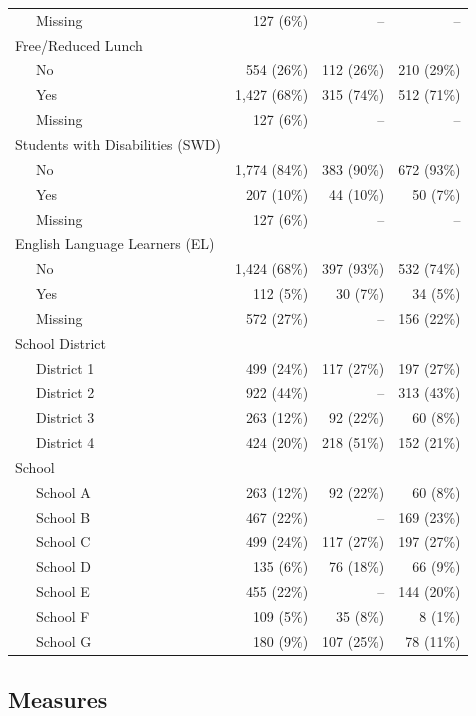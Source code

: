 \documentclass[
  english,
  man, fleqn, noextraspace]{apa6}
\begin{document}
\begin{center}
\begin{ThreePartTable}
\begin{longtable}{lrrr}
\ \ \ Missing & 127 (6\%) & -- & --\\
Free/Reduced Lunch &  &  & \\
\ \ \ No & 554 (26\%) & 112 (26\%) & 210 (29\%)\\
\ \ \ Yes & 1,427 (68\%) & 315 (74\%) & 512 (71\%)\\
\ \ \ Missing & 127 (6\%) & -- & --\\
Students with Disabilities (SWD) &  &  & \\
\ \ \ No & 1,774 (84\%) & 383 (90\%) & 672 (93\%)\\
\ \ \ Yes & 207 (10\%) & 44 (10\%) & 50 (7\%)\\
\ \ \ Missing & 127 (6\%) & -- & --\\
English Language Learners (EL) &  &  & \\
\ \ \ No & 1,424 (68\%) & 397 (93\%) & 532 (74\%)\\
\ \ \ Yes & 112 (5\%) & 30 (7\%) & 34 (5\%)\\
\ \ \ Missing & 572 (27\%) & -- & 156 (22\%)\\
School District &  &  & \\
\ \ \ District 1 & 499 (24\%) & 117 (27\%) & 197 (27\%)\\
\ \ \ District 2 & 922 (44\%) & -- & 313 (43\%)\\
\ \ \ District 3 & 263 (12\%) & 92 (22\%) & 60 (8\%)\\
\ \ \ District 4 & 424 (20\%) & 218 (51\%) & 152 (21\%)\\
School &  &  & \\
\ \ \ School A & 263 (12\%) & 92 (22\%) & 60 (8\%)\\
\ \ \ School B & 467 (22\%) & -- & 169 (23\%)\\
\ \ \ School C & 499 (24\%) & 117 (27\%) & 197 (27\%)\\
\ \ \ School D & 135 (6\%) & 76 (18\%) & 66 (9\%)\\
\ \ \ School E & 455 (22\%) & -- & 144 (20\%)\\
\ \ \ School F & 109 (5\%) & 35 (8\%) & 8 (1\%)\\
\ \ \ School G & 180 (9\%) & 107 (25\%) & 78 (11\%)\\
\bottomrule
\end{longtable}

\end{ThreePartTable}
\end{center}

\hypertarget{measures}{%
\subsection{Measures}\label{measures}}
\end{document}
